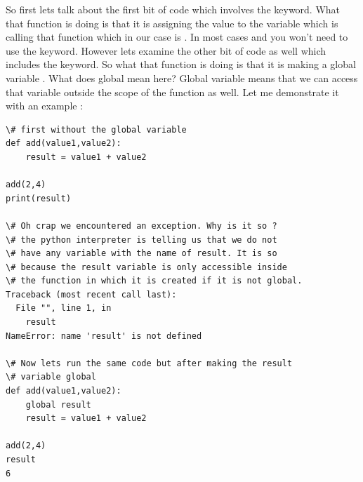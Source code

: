 \documentclass[a4paper,12pt,oneside]{sphinxmanual}
\begin{document}
So first lets talk about the first bit of code which involves the
 keyword. What that function is doing is that it is assigning
the value to the variable which is calling that function which in our
case is . In most cases and you won't need to use the
 keyword. However lets examine the other bit of code as well
which includes the  keyword. So what that function is doing is
that it is making a global variable . What does global mean
here? Global variable means that we can access that variable outside the
scope of the function as well. Let me demonstrate it with an example :
\begin{Verbatim}[commandchars=\\\{\}]
\# first without the global variable
def add(value1,value2):
    result = value1 + value2

add(2,4)
print(result)

\# Oh crap we encountered an exception. Why is it so ?
\# the python interpreter is telling us that we do not
\# have any variable with the name of result. It is so
\# because the result variable is only accessible inside
\# the function in which it is created if it is not global.
Traceback (most recent call last):
  File "", line 1, in
    result
NameError: name 'result' is not defined

\# Now lets run the same code but after making the result
\# variable global
def add(value1,value2):
    global result
    result = value1 + value2

add(2,4)
result
6
\end{Verbatim}
\end{document}
